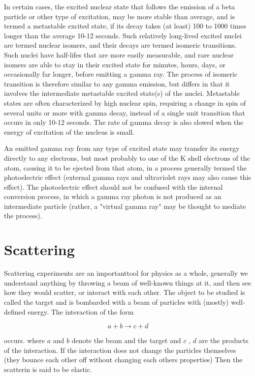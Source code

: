 \documentclass[10pt,a4paper]{article}
\begin{document}
In certain cases, the excited nuclear state that follows the emission of a beta particle or other type of excitation, may be more stable than average, and is termed a metastable excited state, if its decay takes (at least) 100 to 1000 times longer than the average 10-12 seconds. Such relatively long-lived excited nuclei are termed nuclear isomers, and their decays are termed isomeric transitions. Such nuclei have half-lifes that are more easily measurable, and rare nuclear isomers are able to stay in their excited state for minutes, hours, days, or occasionally far longer, before emitting a gamma ray. The process of isomeric transition is therefore similar to any gamma emission, but differs in that it involves the intermediate metastable excited state(s) of the nuclei. Metastable states are often characterized by high nuclear spin, requiring a change in spin of several units or more with gamma decay, instead of a single unit transition that occurs in only 10-12 seconds. The rate of gamma decay is also slowed when the energy of excitation of the nucleus is small.

An emitted gamma ray from any type of excited state may transfer its energy directly to any electrons, but most probably to one of the K shell electrons of the atom, causing it to be ejected from that atom, in a process generally termed the photoelectric effect (external gamma rays and ultraviolet rays may also cause this effect). The photoelectric effect should not be confused with the internal conversion process, in which a gamma ray photon is not produced as an intermediate particle (rather, a "virtual gamma ray" may be thought to mediate the process). 

\section{Scattering}
Scattering experiments are an importanttool for physics as a whole, generally we understand anything by throwing a beam of well-known things at it, and then see how they would scatter, or interact with each other. The object to be studied is called the target and is bombarded with a beam of particles with (mostly) well-defined energy. The interaction of the form

$$
a + b\rightarrow c+d
$$

occurs. where $a$ and $b$ denote the beam and the target and $c$ , $d$ are the products of the interaction. If the interaction does not change the particles themselves (they bounce each other off without changing each others properties) Then the scatterin is said to be elastic.
\end{document}
